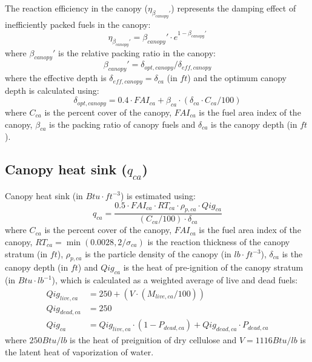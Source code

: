 \documentclass[]{book}
\begin{document}
The reaction efficiency in the canopy (\(\eta_{\beta_{canopy}'}\)) represents the damping effect of inefficiently packed fuels in the canopy:
\begin{equation}
\eta_{\beta_{canopy}'} =\beta_{canopy}'\cdot e^{1- \beta_{canopy}'}
\end{equation}
where \(\beta_{canopy}'\) is the relative packing ratio in the canopy:
\begin{equation}
\beta_{canopy}' = \delta_{opt, canopy} / \delta_{eff, canopy}
\end{equation}
where the effective depth is \(\delta_{eff, canopy}=\delta_{ca}\) (in \(ft\)) and the optimum canopy depth is calculated using:
\begin{equation}
\delta_{opt, canopy} = 0.4 \cdot FAI_{ca} + \beta_{ca} \cdot (\delta_{ca} \cdot C_{ca}/100)
\end{equation}
where \(C_{ca}\) is the percent cover of the canopy, \(FAI_{ca}\) is the fuel area index of the canopy, \(\beta_{ca}\) is the packing ratio of canopy fuels and \(\delta_{ca}\) is the canopy depth (in \(ft\)).

\hypertarget{canopy-heat-sink-q_ca}{%
\subsection{\texorpdfstring{Canopy heat sink (\(q_{ca}\))}{Canopy heat sink (q\_\{ca\})}}\label{canopy-heat-sink-q_ca}}

Canopy heat sink (in \(Btu \cdot ft^{-3}\)) is estimated using:
\begin{equation}
q_{ca} = \frac{0.5 \cdot FAI_{ca} \cdot RT_{ca} \cdot \rho_{p, ca} \cdot Qig_{ca}}{(C_{ca}/100)\cdot \delta_{ca}}
\end{equation}
where \(C_{ca}\) is the percent cover of the canopy, \(FAI_{ca}\) is the fuel area index of the canopy, \(RT_{ca} = \min(0.0028, 2/\sigma_{ca})\) is the reaction thickness of the canopy stratum (in \(ft\)), \(\rho_{p, ca}\) is the particle density of the canopy (in \(lb \cdot ft^{-3}\)), \(\delta_{ca}\) is the canopy depth (in \(ft\)) and \(Qig_{ca}\) is the heat of pre-ignition of the canopy stratum (in \(Btu \cdot lb^{-1}\)), which is calculated as a weighted average of live and dead fuels:
\begin{eqnarray}
Qig_{live, ca} &= 250 + (V\cdot (M_{live, ca}/100))\\
Qig_{dead, ca} &= 250\\
Qig_{ca} &= Qig_{live, ca} \cdot (1 - P_{dead, ca})+ Qig_{dead, ca} \cdot P_{dead, ca}
\end{eqnarray}
where \(250 Btu/lb\) is the heat of preignition of dry cellulose and \(V = 1116 Btu/lb\) is the latent heat of vaporization of water.
\end{document}
